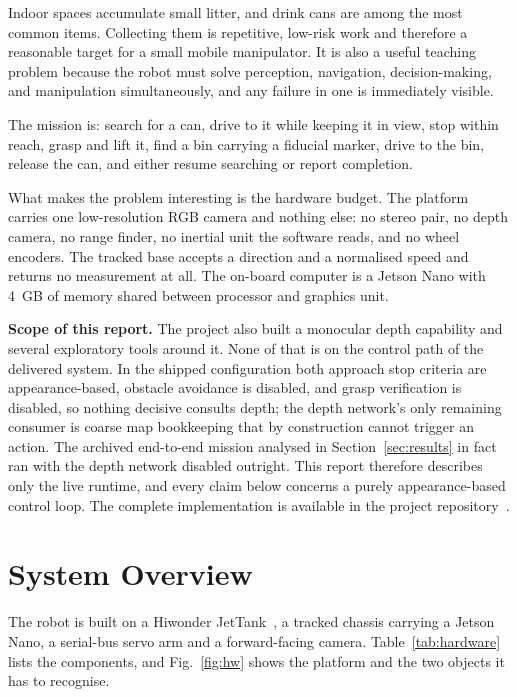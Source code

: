 \documentclass[conference,a4paper,10pt]{IEEEtran}
\begin{document}
Indoor spaces accumulate small litter, and drink cans are among the most
common items. Collecting them is repetitive, low-risk work and therefore
a reasonable target for a small mobile manipulator. It is also a useful
teaching problem because the robot must solve perception, navigation,
decision-making, and manipulation simultaneously, and any failure in one
is immediately visible.

The mission is: search for a can, drive to it while keeping it in view,
stop within reach, grasp and lift it, find a bin carrying a fiducial
marker, drive to the bin, release the can, and either resume searching or
report completion.

What makes the problem interesting is the hardware budget. The platform
carries one low-resolution RGB camera and nothing else: no stereo pair,
no depth camera, no range finder, no inertial unit the software reads,
and no wheel encoders. The tracked base accepts a direction and a
normalised speed and returns no measurement at all. The on-board computer
is a Jetson Nano with 4~GB of memory shared between processor and
graphics unit.

\textbf{Scope of this report.} The project also built a monocular depth
capability and several exploratory tools around it. None of that is on
the control path of the delivered system. In the shipped configuration
both approach stop criteria are appearance-based, obstacle avoidance is
disabled, and grasp verification is disabled, so nothing decisive
consults depth; the depth network's only remaining consumer is coarse map
bookkeeping that by construction cannot trigger an action. The archived
end-to-end mission analysed in Section~\ref{sec:results} in fact ran with
the depth network disabled outright. This report therefore describes only
the live runtime, and every claim below concerns a purely
appearance-based control loop. The complete implementation is available
in the project repository~\cite{spas_repo}.

\section{System Overview}

The robot is built on a Hiwonder JetTank~\cite{hiwonder}, a tracked
chassis carrying a Jetson Nano, a serial-bus servo arm and a
forward-facing camera. Table~\ref{tab:hardware} lists the components, and
Fig.~\ref{fig:hw} shows the platform and the two objects it has to
recognise.
\end{document}
